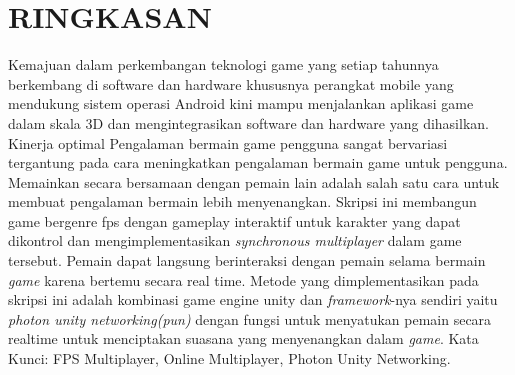 \chapter*{RINGKASAN}
Kemajuan dalam perkembangan teknologi game yang setiap tahunnya berkembang di 
software dan hardware khususnya  perangkat mobile yang mendukung sistem operasi Android 
kini mampu menjalankan aplikasi game dalam skala 3D dan mengintegrasikan software dan hardware yang dihasilkan. 
Kinerja optimal Pengalaman bermain game pengguna sangat bervariasi tergantung pada cara  meningkatkan pengalaman bermain game untuk pengguna. 
Memainkan secara bersamaan dengan pemain lain adalah salah satu cara untuk membuat pengalaman bermain lebih menyenangkan. 
Skripsi ini membangun game bergenre fps dengan gameplay  interaktif untuk 
karakter yang dapat dikontrol dan mengimplementasikan \textit{synchronous multiplayer} dalam game tersebut. 
Pemain dapat langsung berinteraksi dengan 
pemain selama bermain \textit{game} karena bertemu secara real time. 
Metode yang dimplementasikan pada skripsi ini adalah kombinasi game engine unity dan \textit{framework}-nya sendiri yaitu \textit{photon unity networking(pun)}
dengan fungsi untuk menyatukan pemain secara realtime untuk menciptakan suasana yang menyenangkan dalam \textit{game}.
\newline \break
\noindent Kata Kunci: FPS Multiplayer, Online Multiplayer, Photon Unity Networking.